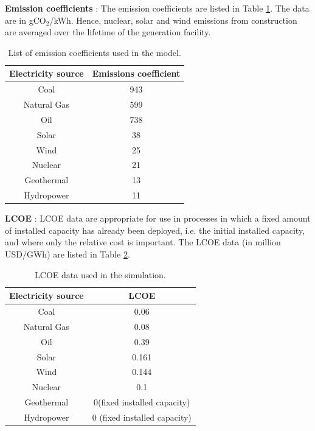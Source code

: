 \documentclass[14pt,a4paper]{article} %
\begin{document}
\textbf{Emission coefficients} \cite{noauthor_electricity_2017}: The emission coefficients are listed in Table \ref{tab:emi}. The data are in gCO$_2$/kWh. Hence, nuclear, solar and wind emissions from construction are averaged over the lifetime of the generation facility.

\begin{table}[H]
\centering
\caption{\label{tab:emi} List of emission coefficients used in the model.}
\vspace{2mm}
\begin{tabular}{|c|c|}
\hline
\textbf{Electricity source} & \textbf{Emissions coefficient}\\
\hline
Coal & 943 \\
\hline
Natural Gas & 599 \\
\hline
Oil & 738 \\
\hline
Solar & 38 \\
\hline
Wind & 25 \\
\hline
Nuclear & 21 \\
\hline
Geothermal & 13 \\
\hline
Hydropower & 11 \\
\hline
\end{tabular}
\end{table}

\textbf{\gls{LCOE}}\cite{noauthor_lazards_2017} : \gls{LCOE} data are appropriate for use in processes in which a fixed amount of installed capacity has already been deployed, i.e. the initial installed capacity, and where only the relative cost is important. The \gls{LCOE} data (in million USD/GWh) are listed in Table \ref{tab:lcoe}. \\

\begin{table}[H]
\centering
\caption{\label{tab:lcoe} \gls{LCOE} data used in the simulation.}
\vspace{2mm}
\begin{tabular}{|c|c|}
\hline
\textbf{Electricity source} & \textbf{LCOE}\\
\hline
Coal & 0.06 \\
\hline
Natural Gas & 0.08 \\
\hline
Oil & 0.39 \\
\hline
Solar & 0.161 \\
\hline
Wind & 0.144 \\
\hline
Nuclear & 0.1 \\
\hline
Geothermal & 0(fixed installed  capacity) \\
\hline
Hydropower & 0 (fixed installed  capacity) \\
\hline
\end{tabular}
\end{table}
\end{document}
